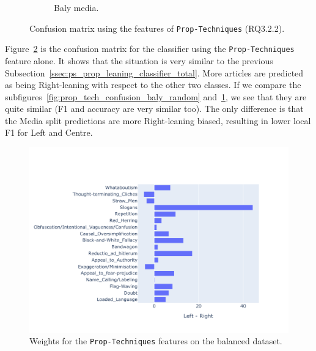 \begin{figure}[!htbp]
\begin{subfigure}[b]{0.48\linewidth}
        \caption{Baly media.}
        \label{fig:prop_tech_confusion_baly_media}
    \end{subfigure}
    \caption{Confusion matrix using the features of \texttt{Prop-Techniques} (RQ3.2.2).}
    \label{fig:prop_tech_confusion}
\end{figure}


Figure~\ref{fig:prop_tech_confusion} is the confusion matrix for the classifier using the \texttt{Prop-Techniques} feature alone. It shows that the situation is very similar to the previous Subsection~\ref{ssec:ps_prop_leaning_classifier_total}. More articles are predicted as being Right-leaning with respect to the other two classes. %
If we compare the subfigures~\ref{fig:prop_tech_confusion_baly_random} and~\ref{fig:prop_tech_confusion_baly_media}, we see that they are quite similar (F1 and accuracy are very similar too). The only difference is that the Media split predictions are more Right-leaning biased, resulting in lower local F1 for Left and Centre.


\begin{figure}[!htbp]
    \centering
    \includegraphics[trim={0cm 0.9cm 2cm 2.5cm},clip,width=\linewidth]{figures/nodes_stratifiedbalanced_weights_propaganda_percentages-small-simple.pdf}
    \caption{Weights for the \texttt{Prop-Techniques} features on the balanced dataset.}
    \label{fig:prop_tech_weights}
\end{figure}

